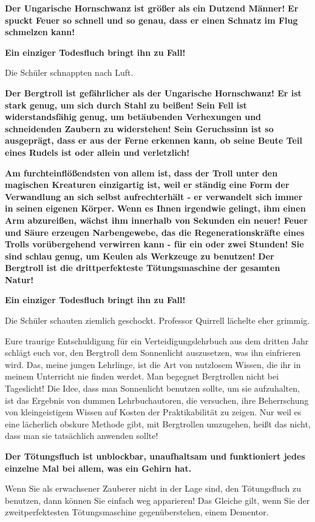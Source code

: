 \glqq{}\textbf{Der Ungarische Hornschwanz ist größer als ein Dutzend Männer!}
\textbf{Er spuckt Feuer so schnell und so genau, dass er einen Schnatz im Flug
schmelzen kann!}

\textbf{Ein einziger Todesfluch bringt ihn zu Fall!\grqq{}}

Die Schüler schnappten nach Luft.

\textbf{\glqq{}Der Bergtroll ist gefährlicher als der Ungarische Hornschwanz! Er
ist stark genug, um sich durch Stahl zu beißen! Sein Fell ist widerstandsfähig
genug, um betäubenden Verhexungen und schneidenden Zaubern zu widerstehen! Sein
Geruchssinn ist so ausgeprägt, dass er aus der Ferne erkennen kann, ob seine
Beute Teil eines Rudels ist oder allein und verletzlich!}

\textbf{Am furchteinflößendsten von allem ist, dass der Troll unter den
magischen Kreaturen einzigartig ist, weil er ständig eine Form der Verwandlung
an sich selbst aufrechterhält - er verwandelt sich immer in seinen eigenen
Körper.} \textbf{Wenn es Ihnen irgendwie gelingt, ihm einen Arm abzureißen,
wächst ihm innerhalb von Sekunden ein neuer! Feuer und Säure erzeugen
Narbengewebe, das die Regenerationskräfte eines Trolls vorübergehend verwirren
kann - für ein oder zwei Stunden! Sie sind schlau genug, um Keulen als Werkzeuge
zu benutzen!} \textbf{Der Bergtroll ist die drittperfekteste Tötungsmaschine
der gesamten Natur!}

\textbf{Ein einziger Todesfluch bringt ihn zu Fall!}\grqq{}

Die Schüler schauten ziemlich geschockt. Professor Quirrell lächelte eher
grimmig.

\glqq{}Eure traurige Entschuldigung für ein Verteidigungslehrbuch aus dem dritten
Jahr schlägt euch vor, den Bergtroll dem Sonnenlicht auszusetzen, was ihn
einfrieren wird. Das, meine jungen Lehrlinge, ist die Art von nutzlosem Wissen,
die ihr in meinem Unterricht nie finden werdet. Man begegnet Bergtrollen nicht
bei Tageslicht! Die Idee, dass man Sonnenlicht benutzen sollte, um sie
aufzuhalten, ist das Ergebnis von dummen Lehrbuchautoren, die versuchen, ihre
Beherrschung von kleingeistigem Wissen auf Kosten der Praktikabilität zu zeigen.
Nur weil es eine lächerlich obskure Methode gibt, mit Bergtrollen umzugehen,
heißt das nicht, dass man sie tatsächlich anwenden sollte!

\textbf{Der Tötungsfluch ist unblockbar, unaufhaltsam und funktioniert jedes
einzelne Mal bei allem, was ein Gehirn hat.}

Wenn Sie als erwachsener Zauberer nicht in der Lage sind, den Tötungsfluch zu
benutzen, dann können Sie einfach weg apparieren! Das Gleiche gilt, wenn Sie der
zweitperfektesten Tötungsmaschine gegenüberstehen, einem Dementor.

